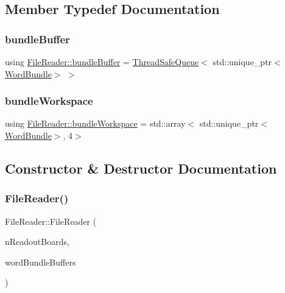 \subsection{Member Typedef Documentation}
\mbox{\label{class_file_reader_ac755c1e271610c2c12a7fc5b55cc048b}} 
\subsubsection{\texorpdfstring{bundle\+Buffer}{bundleBuffer}}
{\footnotesize\ttfamily using \hyperlink{class_file_reader_ac755c1e271610c2c12a7fc5b55cc048b}{File\+Reader\+::bundle\+Buffer} =  \hyperlink{class_thread_safe_queue}{Thread\+Safe\+Queue}$<$ std\+::unique\+\_\+ptr$<$\hyperlink{class_word_bundle}{Word\+Bundle}$>$ $>$\hspace{0.3cm}{\ttfamily [private]}}

\mbox{\label{class_file_reader_a7fb625dc45cee3256d37cc19c65cad86}} 
\subsubsection{\texorpdfstring{bundle\+Workspace}{bundleWorkspace}}
{\footnotesize\ttfamily using \hyperlink{class_file_reader_a7fb625dc45cee3256d37cc19c65cad86}{File\+Reader\+::bundle\+Workspace} =  std\+::array$<$ std\+::unique\+\_\+ptr$<$\hyperlink{class_word_bundle}{Word\+Bundle}$>$, 4$>$\hspace{0.3cm}{\ttfamily [private]}}



\subsection{Constructor \& Destructor Documentation}
\mbox{\label{class_file_reader_af7f6550dfccc640680792a51d997adca}} 
\subsubsection{\texorpdfstring{File\+Reader()}{FileReader()}}
{\footnotesize\ttfamily File\+Reader\+::\+File\+Reader (\begin{DoxyParamCaption}\item[{const unsigned int}]{n\+Readout\+Boards,  }\item[{std\+::array$<$ std\+::shared\+\_\+ptr$<$ \hyperlink{class_file_reader_ac755c1e271610c2c12a7fc5b55cc048b}{bundle\+Buffer} $>$, 4 $>$}]{word\+Bundle\+Buffers }\end{DoxyParamCaption})}



